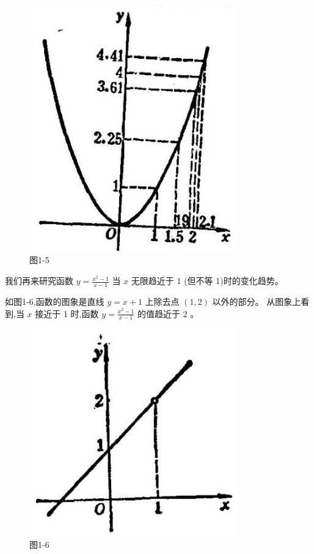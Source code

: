 \documentclass[lang=cn,newtx,12pt,scheme=chinese]{elegantbook}
\begin{document}
\begin{figure}[h]
	\centering
	\includegraphics[max width=0.8\textwidth]{images/01912c18-5c3f-733d-b775-749ba9897a9d_23_174405.jpg}
	\caption{图1-5}
\end{figure}

我们再来研究函数 \(y = \frac{{x}^{2} - 1}{x - 1}\) 当 \(x\) 无限趋近于 1 (但不等 1)时的变化趋势。

如图1-6,函数的图象是直线 \(y = x + 1\) 上除去点 \(\left( {1,2}\right)\) 以外的部分。 从图象上看到,当 \(x\) 接近于 1 时,函数 \(y = \frac{{x}^{2} - 1}{x - 1}\) 的值趋近于 2 。

\begin{figure}[h]
	\centering
	\includegraphics[max width=0.8\textwidth]{images/01912c18-5c3f-733d-b775-749ba9897a9d_24_728399.jpg}
	\caption{图1-6}
\end{figure}
\end{document}
